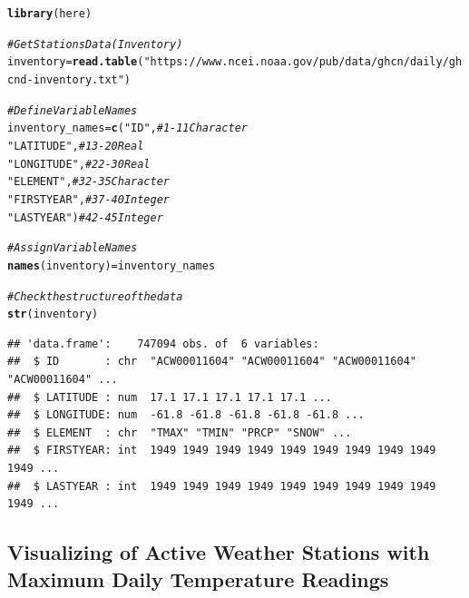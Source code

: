 \documentclass{article}\usepackage[]{graphicx}\usepackage[]{xcolor}
\makeatletter
\newcommand{\hlstr}[1]{\textcolor[rgb]{0.192,0.494,0.8}{#1}}%
\newcommand{\hlcom}[1]{\textcolor[rgb]{0.678,0.584,0.686}{\textit{#1}}}%
\newcommand{\hlstd}[1]{\textcolor[rgb]{0.345,0.345,0.345}{#1}}%
\newcommand{\hlkwb}[1]{\textcolor[rgb]{0.69,0.353,0.396}{#1}}%
\newcommand{\hlkwd}[1]{\textcolor[rgb]{0.737,0.353,0.396}{\textbf{#1}}}%
\newenvironment{kframe}{%
 \def\at@end@of@kframe{}%
 \ifinner\ifhmode%
  \def\at@end@of@kframe{\end{minipage}}%
  \begin{minipage}{\columnwidth}%
 \fi\fi%
 \def\FrameCommand##1{\hskip\@totalleftmargin \hskip-\fboxsep
 \colorbox{shadecolor}{##1}\hskip-\fboxsep
     \hskip-\linewidth \hskip-\@totalleftmargin \hskip\columnwidth}%
 \MakeFramed {\advance\hsize-\width
   \@totalleftmargin\z@ \linewidth\hsize
   \@setminipage}}%
 {\par\unskip\endMakeFramed%
 \at@end@of@kframe}
\newenvironment{knitrout}{}{} %
\makeatother
\begin{document}
\begin{knitrout}
\color{fgcolor}\begin{kframe}
\begin{alltt}
\hlkwd{library}\hlstd{(here)}
\end{alltt}


{\ttfamily\noindent\itshape\color{messagecolor}{\#\# here() starts at /home/mwl04747/RTricks}}\begin{alltt}
\hlcom{# Get Stations Data (Inventory)}
\hlstd{inventory} \hlkwb{=} \hlkwd{read.table}\hlstd{(}\hlstr{"https://www.ncei.noaa.gov/pub/data/ghcn/daily/ghcnd-inventory.txt"}\hlstd{)}

\hlcom{# Define Variable Names}
\hlstd{inventory_names} \hlkwb{=} \hlkwd{c}\hlstd{(}\hlstr{"ID"}\hlstd{,} \hlcom{#            1-11   Character}
                      \hlstr{"LATITUDE"}\hlstd{,} \hlcom{#     13-20   Real}
                      \hlstr{"LONGITUDE"}\hlstd{,} \hlcom{#    22-30   Real}
                      \hlstr{"ELEMENT"}\hlstd{,} \hlcom{#      32-35   Character}
                      \hlstr{"FIRSTYEAR"}\hlstd{,} \hlcom{#    37-40   Integer}
                      \hlstr{"LASTYEAR"}\hlstd{)} \hlcom{#     42-45   Integer}

\hlcom{# Assign Variable Names}
\hlkwd{names}\hlstd{(inventory)} \hlkwb{=} \hlstd{inventory_names}

\hlcom{# Check the structure of the data}
\hlkwd{str}\hlstd{(inventory)}
\end{alltt}
\begin{verbatim}
## 'data.frame':	747094 obs. of  6 variables:
##  $ ID       : chr  "ACW00011604" "ACW00011604" "ACW00011604" "ACW00011604" ...
##  $ LATITUDE : num  17.1 17.1 17.1 17.1 17.1 ...
##  $ LONGITUDE: num  -61.8 -61.8 -61.8 -61.8 -61.8 ...
##  $ ELEMENT  : chr  "TMAX" "TMIN" "PRCP" "SNOW" ...
##  $ FIRSTYEAR: int  1949 1949 1949 1949 1949 1949 1949 1949 1949 1949 ...
##  $ LASTYEAR : int  1949 1949 1949 1949 1949 1949 1949 1949 1949 1949 ...
\end{verbatim}
\end{kframe}
\end{knitrout}

\subsection{Visualizing of Active Weather Stations with Maximum Daily Temperature Readings}
\end{document}
